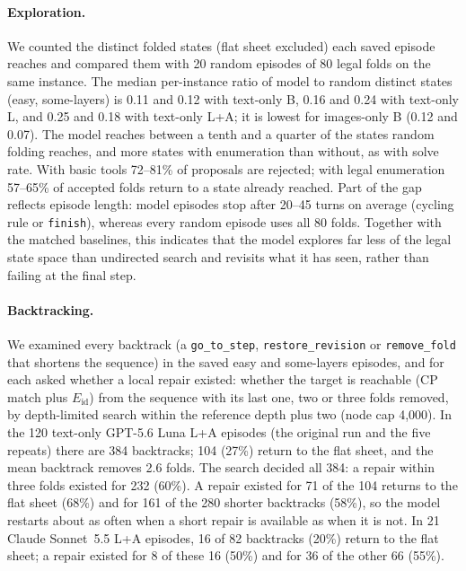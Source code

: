 \paragraph{Exploration.} We counted the distinct folded states (flat sheet excluded) each saved
episode reaches and compared them with 20 random episodes of 80 legal folds on the same instance.
The median per-instance ratio of model to random distinct states (easy, some-layers) is 0.11 and
0.12 with text-only B, 0.16 and 0.24 with text-only L, and 0.25 and 0.18 with text-only L+A; it is
lowest for images-only B (0.12 and 0.07). The model reaches between a tenth and a quarter of the
states random folding reaches, and more states with enumeration than without, as with solve rate.
With basic tools 72--81\% of proposals are rejected; with legal enumeration 57--65\% of accepted
folds return to a state already reached. Part of the gap reflects episode length: model episodes
stop after 20--45 turns on average (cycling rule or \texttt{finish}), whereas every random episode
uses all 80 folds. Together with the matched baselines, this indicates that the model explores
far less of the legal state space than undirected search and revisits what it has seen, rather
than failing at the final step.

\paragraph{Backtracking.} We examined every backtrack (a \texttt{go\_to\_step},
\texttt{restore\_revision} or \texttt{remove\_fold} that shortens the sequence) in the saved easy and
some-layers episodes, and for each asked whether a local repair existed: whether the target is
reachable (CP match plus $E_{\mathrm{id}}$) from the sequence with its last one, two or three folds
removed, by depth-limited search within the reference depth plus two (node cap 4,000). In the
120 text-only GPT-5.6 Luna L+A episodes (the original run and the five repeats) there are 384
backtracks; 104 (27\%) return to the flat sheet, and the mean backtrack removes 2.6 folds. The
search decided all 384: a repair within three folds existed for 232 (60\%). A repair existed for
71 of the 104 returns to the flat sheet (68\%) and for 161 of the 280 shorter backtracks (58\%), so
the model restarts about as often when a short repair is available as when it is not. In 21 Claude
Sonnet~5.5 L+A episodes, 16 of 82 backtracks (20\%) return to the flat sheet; a repair existed for
8 of these 16 (50\%) and for 36 of the other 66 (55\%).

